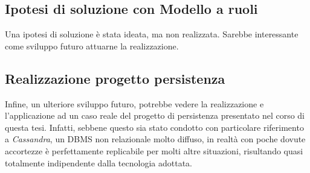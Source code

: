 	\subsection{Ipotesi di soluzione con Modello a ruoli}
	
	
		Una ipotesi di soluzione è stata ideata, ma non realizzata. Sarebbe interessante come sviluppo futuro attuarne la realizzazione.
		
	
	\subsection{Realizzazione progetto persistenza}
		

	Infine, un ulteriore sviluppo futuro, potrebbe vedere la realizzazione e l'applicazione ad un caso reale del progetto di persistenza presentato nel corso di questa tesi. Infatti, sebbene questo sia stato condotto con particolare riferimento a \textit{Cassandra}, un DBMS non relazionale molto diffuso, in realtà con poche dovute accortezze è perfettamente replicabile per molti altre situazioni, risultando quasi totalmente indipendente dalla tecnologia adottata.